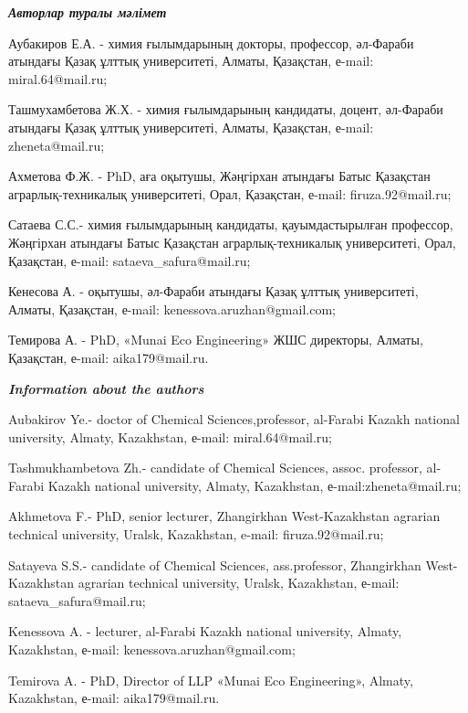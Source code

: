 \begin{info}
\hspace{1em}\emph{{\bfseries Авторлар туралы мәлімет}}

Аубакиров Е.А. - химия ғылымдарының докторы, профессор, әл-Фараби
атындағы Қазақ ұлттық университеті, Алматы, Қазақстан, е-mail:
miral.64@mail.ru;

Ташмухамбетова Ж.Х. - химия ғылымдарының кандидаты, доцент, әл-Фараби
атындағы Қазақ ұлттық университеті, Алматы, Қазақстан, е-mail:
zheneta@mail.ru;

Ахметова Ф.Ж. - PhD, аға оқытушы, Жәңгірхан атындағы Батыс Қазақстан
аграрлық-техникалық университеті, Орал, Қазақстан, е-mail:
firuza.92@mail.ru;

Сатаева С.С.- химия ғылымдарының кандидаты, қауымдастырылған профессор,
Жәңгірхан атындағы Батыс Қазақстан аграрлық-техникалық университеті,
Орал, Қазақстан, е-mail: sataeva\_safura@mail.ru;

Кенесова А. - оқытушы, әл-Фараби атындағы Қазақ ұлттық университеті,
Алматы, Қазақстан, е-mail: kenessova.aruzhan@gmail.com;

Темирова А. - PhD, «Munai Eco Engineering» ЖШС директоры, Алматы,
Қазақстан, е-mail: aika179@mail.ru.

\hspace{1em}\emph{{\bfseries Information about the authors}}

Aubakirov Ye.- doctor of Chemical Sciences,professor, al-Farabi Kazakh
national university, Almaty, Kazakhstan, е-mail:
miral.64@mail.ru;

Tashmukhambetova Zh.- candidate of Chemical Sciences, assoc. professor,
al-Farabi Kazakh national university, Almaty, Kazakhstan,
е-mail:zheneta@mail.ru;

Akhmetova F.- PhD, senior lecturer, Zhangirkhan West-Kazakhstan agrarian
technical university, Uralsk, Kazakhstan, e-mail:
firuza.92@mail.ru;

Satayeva S.S.- candidate of Chemical Sciences, ass.professor,
Zhangirkhan West-Kazakhstan agrarian technical university, Uralsk,
Kazakhstan, е-mail: sataeva\_safura@mail.ru;

Kenessova A. - lecturer, al-Farabi Kazakh national university, Almaty,
Kazakhstan, е-mail: kenessova.aruzhan@gmail.com;

Temirova A. - PhD, Director of LLP «Munai Eco Engineering», Almaty,
Kazakhstan, е-mail: aika179@mail.ru.
\end{info}
